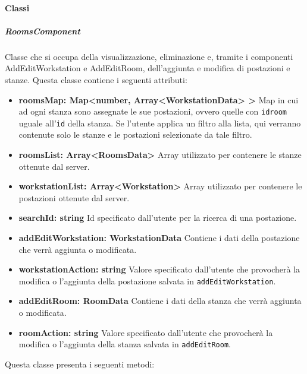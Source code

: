 \paragraph{Classi}
\subparagraph{RoomsComponent}
Classe che si occupa della visualizzazione, eliminazione e, tramite i componenti AddEditWorkstation e AddEditRoom, dell'aggiunta e modifica di postazioni e stanze. \newline
Questa classe contiene i seguenti attributi:
\begin{itemize}
	\item \textbf{roomsMap: Map<number, Array<WorkstationData> >} \newline
		Map in cui ad ogni stanza sono assegnate le sue postazioni, ovvero quelle con \texttt{idroom} uguale all'\texttt{id} della stanza. Se l'utente applica un filtro alla lista, qui verranno contenute solo le stanze e le postazioni selezionate da tale filtro.
	\item \textbf{roomsList: Array<RoomsData>} \newline
		Array utilizzato per contenere le stanze ottenute dal server.
	\item \textbf{workstationList: Array<Workstation>} \newline
		Array utilizzato per contenere le postazioni ottenute dal server.
	\item \textbf{searchId: string} \newline
		Id specificato dall'utente per la ricerca di una postazione.
	\item \textbf{addEditWorkstation: WorkstationData} \newline
		Contiene i dati della postazione che verrà aggiunta o modificata.
	\item \textbf{workstationAction: string} \newline
		Valore specificato dall'utente che provocherà la modifica o l'aggiunta della postazione salvata in \texttt{addEditWorkstation}.
	\item \textbf{addEditRoom: RoomData} \newline
		Contiene i dati della stanza che verrà aggiunta o modificata.
	\item \textbf{roomAction: string} \newline
		Valore specificato dall'utente che provocherà la modifica o l'aggiunta della stanza salvata in \texttt{addEditRoom}.
\end{itemize}
Questa classe presenta i seguenti metodi:
